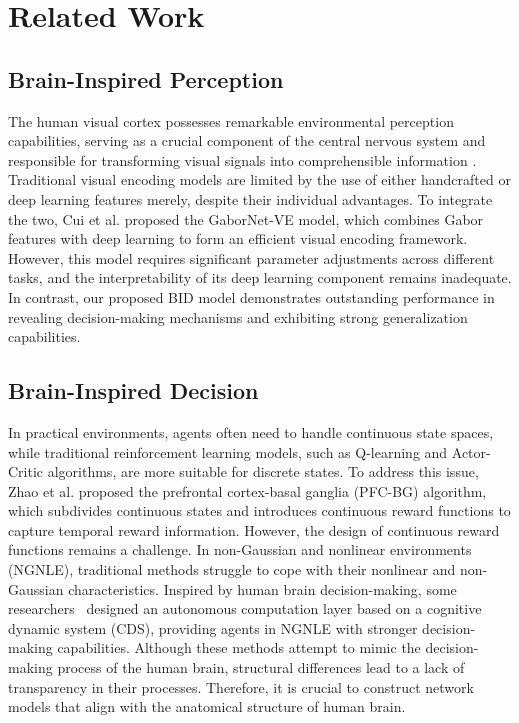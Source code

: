 \section{Related Work}

\subsection{Brain-Inspired Perception}
\hspace{1pc}The human visual cortex possesses remarkable environmental perception capabilities, serving as a crucial component of the central nervous system and responsible for transforming visual signals into comprehensible information \cite{9134376}. 
Traditional visual encoding models are limited by the use of either handcrafted or deep learning features merely, despite their individual advantages\cite{kubilius2019brain}. 
To integrate the two, Cui et al. \cite{8574054} proposed the GaborNet-VE model, which combines Gabor features with deep learning to form an efficient visual encoding framework. 
However, this model requires significant parameter adjustments across different tasks, and the interpretability of its deep learning component remains inadequate\cite{liao2021statistical}. 
In contrast, our proposed BID model demonstrates outstanding performance in revealing decision-making mechanisms and exhibiting strong generalization capabilities.

\subsection{Brain-Inspired Decision}
\hspace{1pc}In practical environments, agents often need to handle continuous state spaces, while traditional reinforcement learning models, such as Q-learning and Actor-Critic algorithms, are more suitable for discrete states\cite{xi2020automatic}. 
To address this issue, Zhao et al. \cite{zhao2018brain} proposed the prefrontal cortex-basal ganglia (PFC-BG) algorithm, which subdivides continuous states and introduces continuous reward functions to capture temporal reward information. 
However, the design of continuous reward functions remains a challenge. 
In non-Gaussian and nonlinear environments (NGNLE), traditional methods struggle to cope with their nonlinear and non-Gaussian characteristics\cite{naghshvarianjahromi2020natural}. 
Inspired by human brain decision-making, some researchers~\cite{8932505} designed an autonomous computation layer based on a cognitive dynamic system (CDS), providing agents in NGNLE with stronger decision-making capabilities. 
Although these methods attempt to mimic the decision-making process of the human brain, structural differences lead to a lack of transparency in their processes. 
Therefore, it is crucial to construct network models that align with the anatomical structure of human brain.


